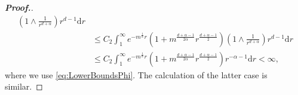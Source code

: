 \documentclass[10pt,a4paper]{amsart}
\renewcommand{\d}{\mathrm{d}}
\begin{document}
\begin{proof}[{\bf Proof.}]
\begin{align*}
\left(1\land \frac{1}{r^{d+\alpha}} \right)r^{d-1}{\d} r\\
&\leq C_2\int_1^{\infty}e^{-m^{\frac{1}{\alpha}}r}(1+m^{\frac{d+\alpha-1}{2\alpha}}r^{\frac{d+\alpha-1}{2}})
\left(1\land \frac{1}{r^{d+\alpha}}\right)r^{d-1}{\d} r\\
&\leq C_2\int_1^{\infty}e^{-m^{\frac{1}{\alpha}}r}
(1+m^{\frac{d+\alpha-1}{2\alpha}}r^{\frac{d+\alpha-1}{2}})
r^{-\alpha-1}{\d} r
<\infty,
\end{align*}
where we use \eqref{eq:LowerBoundsPhi}. The calculation of the latter case is similar. 
\end{proof}
\end{document}
